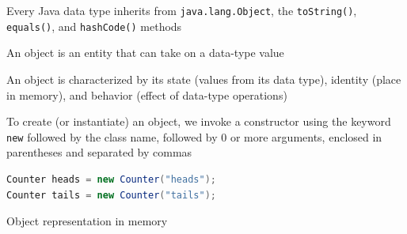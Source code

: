 \documentclass[8pt,a4paper,compress]{beamer}
\begin{document}
\begin{frame}[fragile]
\pause

Every Java data type inherits from \lstinline{java.lang.Object}, the \lstinline{toString()}, \lstinline{equals()}, and \lstinline{hashCode()} methods

\pause\bigskip

An object is an entity that can take on a data-type value

\pause\bigskip

An object is characterized by its state (values from its data type), identity (place in memory), and behavior (effect of data-type operations)

\pause\bigskip

To create (or instantiate) an object, we invoke a constructor using the keyword \lstinline{new} followed by the class name, followed by 0 or more arguments, enclosed in parentheses and separated by commas

\smallskip

\begin{lstlisting}[language=Java,style=focusin]
Counter heads = new Counter("heads");
Counter tails = new Counter("tails");
\end{lstlisting}

\pause\bigskip

Object representation in memory
\begin{center}
\end{center}
\end{frame}
\end{document}
